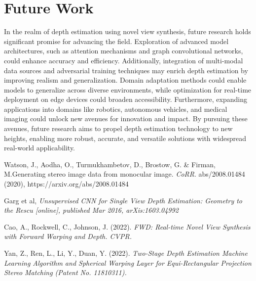 \documentclass[12pt,a4paper]{report}
\begin{document}
\section{Future Work}
In the realm of depth estimation using novel view synthesis, future research holds significant promise for advancing the field. Exploration of advanced model architectures, such as attention mechanisms and graph convolutional networks, could enhance accuracy and efficiency. Additionally, integration of multi-modal data sources and adversarial training techniques may enrich depth estimation by improving realism and generalization. Domain adaptation methods could enable models to generalize across diverse environments, while optimization for real-time deployment on edge devices could broaden accessibility. Furthermore, expanding applications into domains like robotics, autonomous vehicles, and medical imaging could unlock new avenues for innovation and impact. By pursuing these avenues, future research aims to propel depth estimation technology to new heights, enabling more robust, accurate, and versatile solutions with widespread real-world applicability.

\newpage
\renewcommand{\bibname}{References}

\begin{thebibliography}{99}

Watson, J., Aodha, O., Turmukhambetov, D., Brostow, G. \& Firman, M.Generating stereo image data from monocular image. {\em CoRR}. {abs/2008.01484} (2020), https://arxiv.org/abs/2008.01484


Garg et al,
\textit{Unsupervised CNN for Single View Depth Estimation: Geometry to the Rescu [online], published Mar 2016, arXis:1603.04992}

Cao, A., Rockwell, C., Johnson, J. (2022).
\textit{ FWD: Real-time Novel View Synthesis with Forward Warping and Depth. CVPR.}

Yan, Z., Ren, L., Li, Y., Duan, Y. (2022).
\textit{ Two-Stage Depth Estimation Machine Learning Algorithm and Spherical Warping Layer for Equi-Rectangular Projection Stereo Matching (Patent No. 11810311).}

\end{thebibliography}
\end{document}
